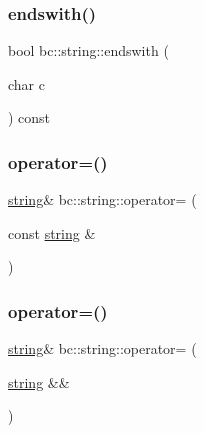 \mbox{\label{structbc_1_1string_ab1c88afd1da0390046facb85eb63a1a1}} 
\subsubsection{\texorpdfstring{endswith()}{endswith()}\hspace{0.1cm}{\footnotesize\ttfamily [2/2]}}
{\footnotesize\ttfamily bool bc\+::string\+::endswith (\begin{DoxyParamCaption}\item[{char}]{c }\end{DoxyParamCaption}) const\hspace{0.3cm}{\ttfamily [inline]}}

\mbox{\label{structbc_1_1string_a3874531b3865038fd50d992f681c4469}} 
\subsubsection{\texorpdfstring{operator=()}{operator=()}\hspace{0.1cm}{\footnotesize\ttfamily [1/2]}}
{\footnotesize\ttfamily \hyperlink{structbc_1_1string}{string}\& bc\+::string\+::operator= (\begin{DoxyParamCaption}\item[{const \hyperlink{structbc_1_1string}{string} \&}]{ }\end{DoxyParamCaption})\hspace{0.3cm}{\ttfamily [default]}}

\mbox{\label{structbc_1_1string_ab37c2b8c95686510ad6344ac01fe8061}} 
\subsubsection{\texorpdfstring{operator=()}{operator=()}\hspace{0.1cm}{\footnotesize\ttfamily [2/2]}}
{\footnotesize\ttfamily \hyperlink{structbc_1_1string}{string}\& bc\+::string\+::operator= (\begin{DoxyParamCaption}\item[{\hyperlink{structbc_1_1string}{string} \&\&}]{ }\end{DoxyParamCaption})\hspace{0.3cm}{\ttfamily [default]}}

